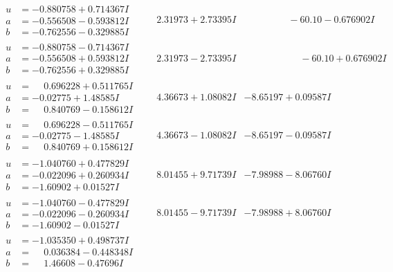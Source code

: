 \documentclass[1p]{elsarticle_modified}
\theoremstyle{definition}
\begin{document}
$$\begin{array}{c|c|c}
\begin{aligned}
u &= -0.880758 + 0.714367 I \\
a &= -0.556508 - 0.593812 I \\
b &= -0.762556 - 0.329885 I\end{aligned}
 & \phantom{-}2.31973 + 2.73395 I & \phantom{-0.000000 }      -6
0. 10   - 0.676902 I \\ \hline\begin{aligned}
u &= -0.880758 - 0.714367 I \\
a &= -0.556508 + 0.593812 I \\
b &= -0.762556 + 0.329885 I\end{aligned}
 & \phantom{-}2.31973 - 2.73395 I & \phantom{-0.000000 -}     -6
0. 10   + 0.676902 I \\ \hline\begin{aligned}
u &= \phantom{-}0.696228 + 0.511765 I \\
a &= -0.02775 + 1.48585 I \\
b &= \phantom{-}0.840769 - 0.158612 I\end{aligned}
 & \phantom{-}4.36673 + 1.08082 I & -8.65197 + 0.09587 I \\ \hline\begin{aligned}
u &= \phantom{-}0.696228 - 0.511765 I \\
a &= -0.02775 - 1.48585 I \\
b &= \phantom{-}0.840769 + 0.158612 I\end{aligned}
 & \phantom{-}4.36673 - 1.08082 I & -8.65197 - 0.09587 I \\ \hline\begin{aligned}
u &= -1.040760 + 0.477829 I \\
a &= -0.022096 + 0.260934 I \\
b &= -1.60902 + 0.01527 I\end{aligned}
 & \phantom{-}8.01455 + 9.71739 I & -7.98988 - 8.06760 I \\ \hline\begin{aligned}
u &= -1.040760 - 0.477829 I \\
a &= -0.022096 - 0.260934 I \\
b &= -1.60902 - 0.01527 I\end{aligned}
 & \phantom{-}8.01455 - 9.71739 I & -7.98988 + 8.06760 I \\ \hline\begin{aligned}
u &= -1.035350 + 0.498737 I \\
a &= \phantom{-}0.036384 - 0.448348 I \\
b &= \phantom{-}1.46608 - 0.47696 I\end{aligned}

\end{array}$$
\end{document}

